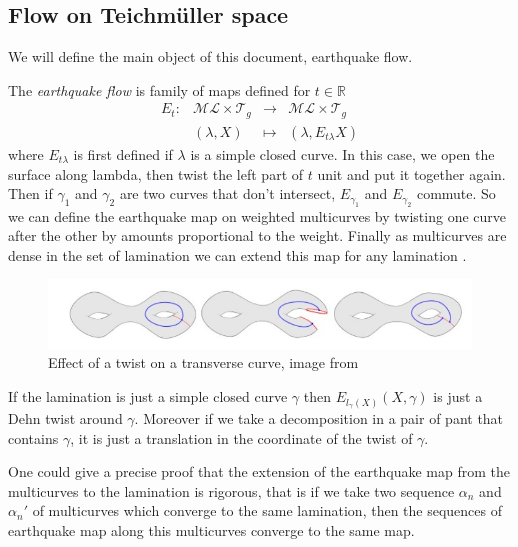 \subsection{Flow on Teichmüller space}

We will define the main object of this document, earthquake flow.

\begin{dfnt}
The \emph{earthquake flow} is family of maps defined for $t \in \mathbb{R}$
\[
\begin{array}{crcl}

E_t: & \mathcal{ML}\times \mathcal{T}_g & \to & \mathcal{ML}\times \mathcal{T}_g \\

& (\lambda,X) & \mapsto & (\lambda,E_{t\lambda}X)

\end{array}
\]
where $E_{t \lambda}$ is first defined if $\lambda$ is a simple closed curve. In this case, we open the surface along lambda, then twist the left part of $t$ unit and put it together again. Then if $\gamma_1$ and $\gamma_2$ are two curves that don't intersect, $E_{\gamma_1}$ and $E_{\gamma_2}$ commute. So we can define the earthquake map on weighted multicurves by twisting one curve after the other by amounts proportional to the weight. Finally as multicurves are dense in the set of lamination we can extend this map for any lamination \cite{NielsenRealizationPro}.
\end{dfnt}

\begin{figure}[h!]
\centering
\includegraphics[width=12cm]{Image/Earthquake.jpg}
\caption{Effect of a twist on a transverse curve, image from \cite{wright2020tour}}
\end{figure}

\begin{rmq}
If the lamination is just a simple closed curve $\gamma$ then $E_{l_{\gamma}(X)}(X,\gamma)$ is just a Dehn twist around $\gamma$.
Moreover if we take a decomposition in a pair of pant that contains $\gamma$, it is just a translation in the coordinate of the twist of $\gamma$.
\end{rmq}

One could give a precise proof that the extension of the earthquake map from the multicurves to the lamination is rigorous, that is if we take two sequence $\alpha_n$ and $\alpha_n'$ of multicurves which converge to the same lamination, then the sequences of earthquake map along this multicurves converge to the same map.

